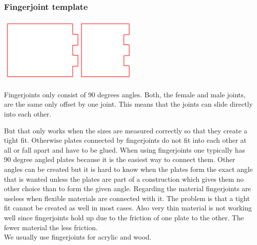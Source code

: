 \documentclass[../ClassicThesis.tex]{subfiles}
\begin{document}
\subsubsection{Fingerjoint template}
\begin{minipage}{0.4\textwidth}
\includegraphics[width=1\columnwidth]{Images/fingerjoints.png}
\end{minipage}
\begin{minipage}{0.6\textwidth}
Fingerjoints only consist of 90 degrees angles. Both, the female and male joints, are the same only offset by one joint. This means that the joints can slide directly into each other. 
\end{minipage}
But that only works when the sizes are measured correctly so that they create a tight fit. Otherwise plates connected by fingerjoints do not fit into each other at all or fall apart and have to be glued. 
When using fingerjoints one typically has 90 degree angled plates because it is the easiest way to connect them. Other angles can be created but it is hard to know when the plates form the exact angle that is wanted unless the plates are part of a construction which gives them no other choice than to form the given angle.
Regarding the material fingerjoints are useless when flexible materials are connected with it. The problem is that a tight fit cannot be created as well in most cases. Also very thin material is not working well since fingerjoints hold up due to the friction of one plate to the other. The fewer material the less friction.\\
We usually use fingerjoints for acrylic and wood.
\end{document}
